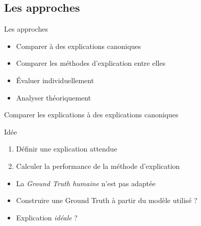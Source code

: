\documentclass[french, 12pt, aspectratio=2013]{beamer}
\begin{document}
    \subsection{Les approches}
        \begin{frame}{Les approches}
            \begin{itemize}
                \item Comparer à des explications canoniques
                \item Comparer les méthodes d'explication entre elles
                \item Évaluer individuellement
                \item Analyser théoriquement
            \end{itemize}
        \end{frame}
        \begin{frame}{Comparer les explications à des explications canoniques}
        
            \begin{block}{Idée}
                \begin{enumerate}
                    \item Définir une explication attendue
                    \item Calculer la performance de la méthode d'explication
                \end{enumerate}
            \end{block}
            \begin{itemize}
                \item La \emph{Ground Truth humaine} n'est pas adaptée
                \item Construire une Ground Truth à partir du modèle utilisé ?
                \item Explication \textit{idéale} ? \cite{neely_song_2022}
            \end{itemize}
            
        \end{frame}
        
\end{document}
